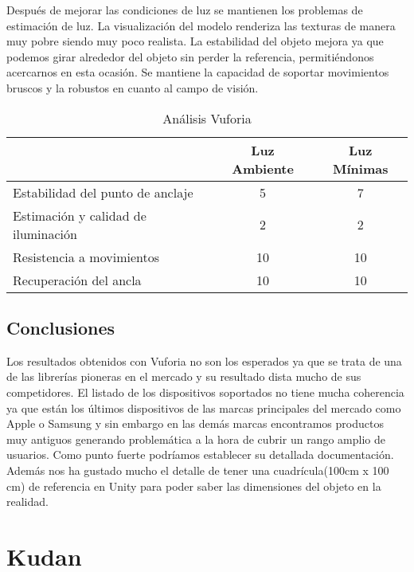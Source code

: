 Después de mejorar las condiciones de luz se mantienen los problemas de estimación de luz. La visualización del modelo renderiza las texturas de manera muy pobre siendo muy poco realista. La estabilidad del objeto mejora ya que podemos girar alrededor del objeto sin perder la referencia, permitiéndonos acercarnos en esta ocasión. Se mantiene la capacidad de soportar movimientos bruscos y la robustos en cuanto al campo de visión.

\begin{table}[H]
    \centering
     \begin{tabular}{|l|c|c|}
    \hline
          & Luz Ambiente & Luz Mínimas \\
         \hline
        Estabilidad del punto de anclaje   & 5 & 7\\
        \hline
        Estimación y calidad de iluminación  &2 &2 \\
        \hline
        Resistencia a movimientos  &10 &10 \\
        \hline
        Recuperación del ancla  &10 &10 \\
      \hline
    \end{tabular}
    \caption{Análisis Vuforia}
    \label{tab:TVuforia}
\end{table}

\subsection{Conclusiones}
Los resultados obtenidos con Vuforia no son los esperados ya que se trata de una de las librerías pioneras en el mercado y su resultado dista mucho de sus competidores. El listado de los dispositivos\cite{Vuforia_Devices} soportados no tiene mucha coherencia ya que están los últimos dispositivos de las marcas principales del mercado como Apple o Samsung y sin embargo en las demás marcas encontramos productos muy antiguos generando problemática a la hora de cubrir un rango amplio de usuarios. Como punto fuerte podríamos establecer su detallada documentación. Además nos ha gustado mucho el detalle de tener una cuadrícula(100cm x 100 cm) de referencia en Unity para poder saber las dimensiones del objeto en la realidad.

\clearpage
\section{Kudan}

